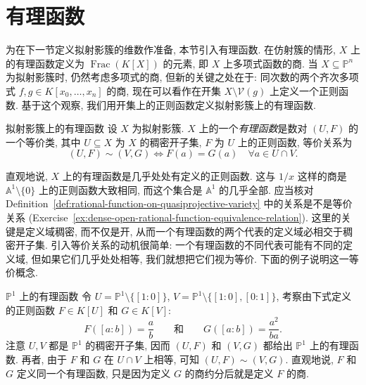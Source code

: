 \section{有理函数}\label{sec:rational-maps-between-varieties}

为在下一节定义拟射影簇的维数作准备, 本节引入有理函数. 在仿射簇的情形, $X$ 上的有理函数定义为 $\operatorname{Frac}(K[X])$ 的元素, 即 $X$ 上多项式函数的商. 当 $X\subseteq\mathbb{P}^{n}$ 为拟射影簇时, 仍然考虑多项式的商, 但新的关键之处在于: 同次数的两个齐次多项式 $f,g\in K[x_{0},\ldots,x_{n}]$ 的商, 现在可以看作在开集 $X\setminus\mathcal{V}(g)$ 上定义一个正则函数. 基于这个观察, 我们用开集上的正则函数定义拟射影簇上的有理函数.

\begin{Definition}{拟射影簇上的有理函数}\leavevmode\label{def:rational-function-on-quasiprojective-variety}
设 $X$ 为拟射影簇. $X$ 上的一个\emph{有理函数}是数对 $(U,F)$ 的一个等价类, 其中 $U\subseteq X$ 为 $X$ 的稠密开子集, $F$ 为 $U$ 上的正则函数, 等价关系为
\[
  (U,F)\sim(V,G)\iff F(a)=G(a)\quad\forall a\in U\cap V.
\]
\end{Definition}

直观地说, $X$ 上的有理函数是\textquotedbl{}几乎处处\textquotedbl{}有定义的正则函数. 这与 $1/x$ 这样的商是 $\mathbb{A}^{1}\setminus\{0\}$ 上的正则函数大致相同, 而这个集合是 $\mathbb{A}^{1}$ 的\textquotedbl{}几乎全部\textquotedbl{}. 应当核对 Definition~\ref{def:rational-function-on-quasiprojective-variety} 中的关系是不是等价关系 (Exercise~\ref{ex:dense-open-rational-function-equivalence-relation}). 这里的关键是定义域稠密, 而不仅是开, 从而一个有理函数的两个代表的定义域必相交于稠密开子集. 引入等价关系的动机很简单: 一个有理函数的不同代表可能有不同的定义域, 但如果它们\textquotedbl{}几乎处处\textquotedbl{}相等, 我们就想把它们视为等价. 下面的例子说明这一等价概念.

\begin{Example}{$\mathbb{P}^{1}$ 上的有理函数}\leavevmode\label{ex:equivalent-rational-functions-on-projective-line}
令 $U=\mathbb{P}^{1}\setminus\{[1:0]\}$, $V=\mathbb{P}^{1}\setminus\{[1:0],[0:1]\}$, 考察由下式定义的正则函数 $F\in K[U]$ 和 $G\in K[V]$:
\[
  F([a:b])=\frac{a}{b}\qquad\text{和}\qquad G([a:b])=\frac{a^{2}}{ba}.
\]
注意 $U,V$ 都是 $\mathbb{P}^{1}$ 的稠密开子集, 因而 $(U,F)$ 和 $(V,G)$ 都给出 $\mathbb{P}^{1}$ 上的有理函数. 再者, 由于 $F$ 和 $G$ 在 $U\cap V$ 上相等, 可知 $(U,F)\sim(V,G)$. 直观地说, $F$ 和 $G$ 定义同一个有理函数, 只是因为定义 $G$ 的商约分后就是定义 $F$ 的商.
\end{Example}

